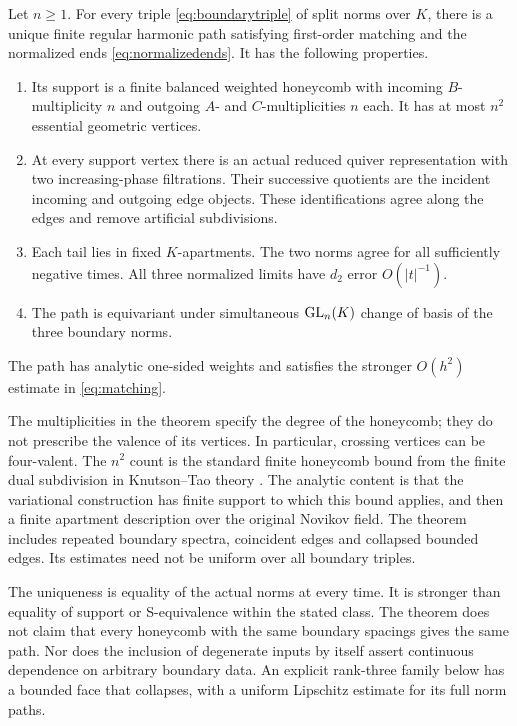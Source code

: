 \begin{theorem}\label{thm:main}
Let $n\ge1$. For every triple \eqref{eq:boundarytriple} of split norms
over $K$, there is a unique finite regular harmonic path satisfying
first-order matching and the normalized ends \eqref{eq:normalizedends}.
It has the following properties.
\begin{enumerate}
\item Its support is a finite balanced weighted honeycomb with incoming
$B$-multiplicity $n$ and outgoing $A$- and $C$-multiplicities $n$ each.
It has at most $n^2$ essential geometric vertices.
\item At every support vertex there is an actual reduced quiver
representation with two increasing-phase filtrations. Their successive
quotients are the incident incoming and outgoing edge objects. These
identifications agree along the edges and remove artificial subdivisions.
\item Each tail lies in fixed $K$-apartments. The two norms agree for
all sufficiently negative times. All three normalized limits have
$d_2$ error $O(|t|^{-1})$.
\item The path is equivariant under simultaneous $\operatorname{GL}_n(K)$ change
of basis of the three boundary norms.
\end{enumerate}
The path has analytic one-sided weights and satisfies the stronger
$O(h^2)$ estimate in \eqref{eq:matching}.
\end{theorem}

The multiplicities in the theorem specify the degree of the honeycomb;
they do not prescribe the valence of its vertices. In particular, crossing
vertices can be four-valent. The $n^2$ count is the standard finite
honeycomb bound from the finite dual subdivision in Knutson--Tao theory
\cite[Lemmas~4 and 6--8 and Theorem~1]{KT99}. The analytic content
is that the variational construction has finite support to which this
bound applies, and then a finite apartment description over the original
Novikov field. The theorem includes repeated boundary spectra,
coincident edges and collapsed bounded edges. Its estimates need not
be uniform over all boundary triples.

The uniqueness is equality of the actual norms at every time. It is
stronger than equality of support or S-equivalence within the stated
class. The theorem does not claim that every honeycomb with the same
boundary spacings gives the same path. Nor does the inclusion of degenerate
inputs by itself assert continuous dependence on arbitrary boundary data.
An explicit rank-three family below has a bounded face that collapses,
with a uniform Lipschitz estimate for its full norm paths.

